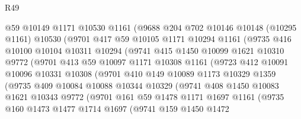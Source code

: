 \begin{lexlean}{R49}
\begin{coremodule}
              @59
              @10149
              @1171
              @10530
              @1161
              (@9688
                @204
                @702
                @10146
                @10148
                (@10295 @1161)
                @10530
                (@9701
                  @417
                  @59
                  @10105
                  @1171
                  @10294
                  @1161
                  (@9735
                    @416
                    @10100
                    @10104
                    @10311
                    @10294
                    (@9741
                      @415
                      @1450
                      @10099
                      @1621
                      @10310
                      @9772
                      (@9701
                        @413
                        @59
                        @10097
                        @1171
                        @10308
                        @1161
                        (@9723
                          @412
                          @10091
                          @10096
                          @10331
                          @10308
                          (@9701
                            @410
                            @149
                            @10089
                            @1173
                            @10329
                            @1359
                            (@9735
                              @409
                              @10084
                              @10088
                              @10344
                              @10329
                              (@9741
                                @408
                                @1450
                                @10083
                                @1621
                                @10343
                                @9772
                                (@9701
                                  @161
                                  @59
                                  @1478
                                  @1171
                                  @1697
                                  @1161
                                  (@9735
                                    @160
                                    @1473
                                    @1477
                                    @1714
                                    @1697
                                    (@9741
                                      @159
                                      @1450
                                      @1472

\end{coremodule}
\end{lexlean}
